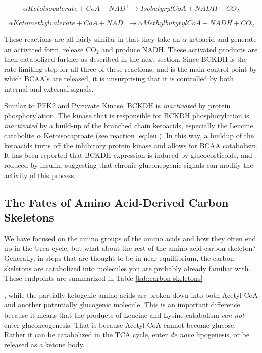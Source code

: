 \documentclass{tufte-handout}
\begin{document}
\begin{equation}\label{eq:val}
\alpha Ketoisovalerate + CoA + NAD^+ \rightarrow IsobutyrylCoA + NADH + CO_2
\end{equation}

\begin{equation}\label{eq:iso}
\alpha Ketomethylvalerate + CoA + NAD^+ \rightarrow \alpha MethylbutyrylCoA + NADH + CO_2
\end{equation}

These reactions are all fairly similar in that they take an $\alpha$-ketoacid and generate an activated form, release CO$_2$ and produce NADH.  These activated products are then catabolized further as described in the next section.  Since BCKDH is the rate limiting step for all three of these reactions, and is the main control point by which BCAA's are released, it is unsurprising that it is controlled by both internal and external signals.

  Similar to PFK2 and Pyruvate Kinase, BCKDH is \emph{inactivated} by protein phosphorylation.  The kinase that is responsible for BCKDH phosphorylation is \emph{inactivated} by a build-up of the branched chain ketoacids, especially the Leucine catabolite $\alpha$ Ketoisocaproate (see reaction \ref{eq:leu}).  In this way, a buildup of the ketoacids turns off the inhibitory protein kinase and allows for BCAA catabolism.  It has been reported that BCKDH expression is induced by glucocorticoids, and reduced by insulin, suggesting that chronic gluconeogenic signals can modify the activity of this process. 

\subsection{The Fates of Amino Acid-Derived Carbon Skeletons}

We have focused on the amino groups of the amino acids and how they often end up in the Urea cycle, but what about the rest of the amino acid carbon skeleton?  Generally, in steps that are thought to be in near-equillibrium, the carbon skeletons are catabolized into molecules you are probably already familiar with.  These endpoints are summarized in Table \ref{tab:carbon-skeletons}

, while the partially ketogenic amino acids are broken down into both Acetyl-CoA and another potentially glucogenic molecule.  This is an important difference because it means that the products of Leucine and Lysine catabolism \emph{can not} enter gluconeogenesis.  That is because Acetyl-CoA cannot become glucose.  Rather it can be catabolized in the TCA cycle, enter \textit{de novo} lipogenesis, or be released as a ketone body.
\end{document}
